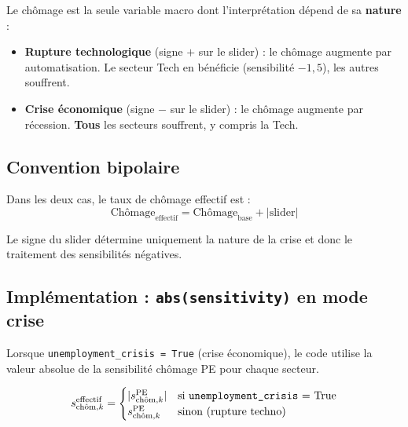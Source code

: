 \documentclass[12pt,a4paper]{article}
\begin{document}
Le ch\^{o}mage est la seule variable macro dont l'interpr\'{e}tation d\'{e}pend de sa \textbf{nature} :

\begin{itemize}
    \item \textbf{Rupture technologique} (signe $+$ sur le slider) : le ch\^{o}mage augmente par
          automatisation. Le secteur Tech en b\'{e}n\'{e}ficie (sensibilit\'{e} $-1{,}5$),
          les autres souffrent.
    \item \textbf{Crise \'{e}conomique} (signe $-$ sur le slider) : le ch\^{o}mage augmente par
          r\'{e}cession. \textbf{Tous} les secteurs souffrent, y compris la Tech.
\end{itemize}

\subsection{Convention bipolaire}

Dans les deux cas, le taux de ch\^{o}mage effectif est :
\begin{equation}
\text{Ch\^{o}mage}_{\text{effectif}} = \text{Ch\^{o}mage}_{\text{base}} + |\text{slider}|
\end{equation}

Le signe du slider d\'{e}termine uniquement la nature de la crise et donc le
traitement des sensibilit\'{e}s n\'{e}gatives.

\subsection{Impl\'{e}mentation : \texttt{abs(sensitivity)} en mode crise}

Lorsque \texttt{unemployment\_crisis = True} (crise \'{e}conomique), le code utilise
la valeur absolue de la sensibilit\'{e} ch\^{o}mage PE pour chaque secteur.

\begin{formulebox}
\begin{equation}
\label{eq:crisis_mode}
s_{\mathrm{ch\hat{o}m},k}^{\mathrm{effectif}} = \begin{cases}
|s_{\mathrm{ch\hat{o}m},k}^{\mathrm{PE}}| & \text{si \texttt{unemployment\_crisis} = True} \\
s_{\mathrm{ch\hat{o}m},k}^{\mathrm{PE}} & \text{sinon (rupture techno)}
\end{cases}
\end{equation}
\end{formulebox}
\end{document}
